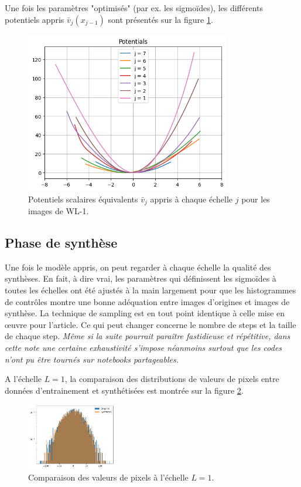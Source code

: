 \documentclass[12pt,twoside]{article}
\begin{document}
Une fois les paramètres "optimisés" (par ex. les sigmoïdes), les différents potentiels appris $\bar{v}_j(x_{j-1})$ sont présentés sur la figure \ref{fig-WL1-potentiels-optim}.

\begin{figure}
\centering
\includegraphics[width=0.8\textwidth]{fig-WL1-potentiels-optim.png}
\caption{Potentiels scalaires équivalents $\bar{v}_j$ appris à chaque échelle $j$ pour les images de WL-1.}
\label{fig-WL1-potentiels-optim}
\end{figure}
%
\subsection{Phase de synthèse}
\label{sec-wcrg-WL1-synt}
%
Une fois le modèle appris, on peut regarder à chaque échelle la qualité des synthèses. En fait, à dire vrai, les paramètres qui définissent les sigmoïdes à toutes les échelles ont été ajustés à la main largement pour que les histogrammes de contrôles montre une bonne adéquation entre images d'origines et images de synthèse. La technique de sampling est en tout point identique à celle mise en œuvre pour l'article. Ce qui peut changer concerne le nombre de steps et la taille de chaque step. \textit{Même si la suite pourrait paraître fastidieuse et répétitive, dans cette note une certaine exhaustivité s'impose néanmoins surtout que les codes n'ont pu être tournés sur notebooks partageables.} 

A l'échelle $L=1$, la comparaison des distributions de valeurs de pixels entre données d'entrainement et synthétisées est montrée sur la figure \ref{fig-WL1-synt-L1-pixelval}.
\begin{figure}
\centering
\includegraphics[width=0.35\textwidth]{fig-WL1-synt-L1-pixelval.png}
\caption{Comparaison des valeurs de pixels à l'échelle $L=1$.}
\label{fig-WL1-synt-L1-pixelval}
\end{figure}
\end{document}
